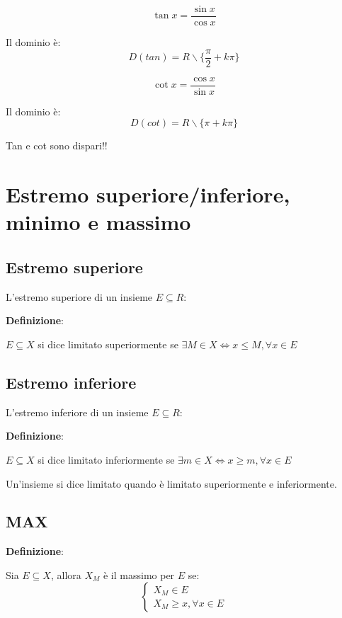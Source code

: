 \begin{equation*}
    \tan x = \frac{\sin x}{\cos x}
\end{equation*}

Il dominio è:
\begin{equation*}
    D(tan) = R \backslash \{ \frac{\pi}{2} + k\pi\}
\end{equation*}

\begin{equation*}
    \cot x = \frac{\cos x}{\sin x}
\end{equation*}

Il dominio è:
\begin{equation*}
    D(cot) = R \backslash \{ \pi + k\pi\}
\end{equation*}

Tan e cot sono dispari!!

\section{Estremo superiore/inferiore, minimo e massimo}

\subsection{Estremo superiore}
L'estremo superiore di un insieme $E \subseteq R$:

\textbf{Definizione}:


$E \subseteq X$ si dice limitato superiormente se $\exists M \in X \Leftrightarrow x\leq M, \forall x \in E$

\subsection{Estremo inferiore}
L'estremo inferiore di un insieme $E \subseteq R$:

\textbf{Definizione}:


$E \subseteq X$ si dice limitato inferiormente se $\exists m \in X \Leftrightarrow x\geq m, \forall x \in E$


Un'insieme si dice limitato quando è limitato superiormente e inferiormente.


\subsection{MAX}
\textbf{Definizione}:

Sia $E \subseteq X$, allora $X_M$ è il massimo per $E$ se:
\begin{equation*}
    \begin{cases}
        X_M \in E \\
        X_M \geq x, \forall x \in E
    \end{cases}
\end{equation*}

